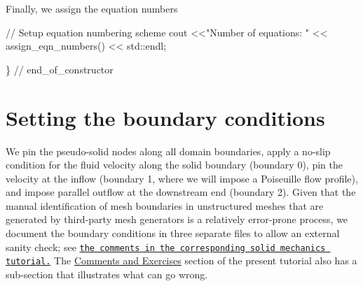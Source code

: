 Finally, we assign the equation numbers


\begin{DoxyCodeInclude}
 
 \textcolor{comment}{// Setup equation numbering scheme}
 cout <<\textcolor{stringliteral}{"Number of equations: "} << assign\_eqn\_numbers() << std::endl; 

\} \textcolor{comment}{// end\_of\_constructor}

\end{DoxyCodeInclude}




 

\hypertarget{index_bound}{}\section{Setting the boundary conditions}\label{index_bound}
We pin the pseudo-\/solid nodes along all domain boundaries, apply a no-\/slip condition for the fluid velocity along the solid boundary (boundary 0), pin the velocity at the inflow (boundary 1, where we will impose a Poiseuille flow profile), and impose parallel outflow at the downstream end (boundary 2). Given that the manual identification of mesh boundaries in unstructured meshes that are generated by third-\/party mesh generators is a relatively error-\/prone process, we document the boundary conditions in three separate files to allow an external sanity check; see \href{../../../solid/unstructured_solid/html/index.html#comm_ex}{\tt the comments in the corresponding solid mechanics tutorial.} The \hyperlink{index_comm_ex}{Comments and Exercises} section of the present tutorial also has a sub-\/section that illustrates what can go wrong.


